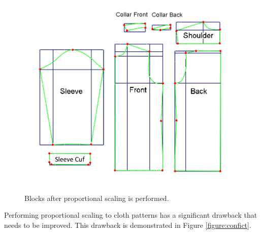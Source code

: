 \begin{figure}[H]
	\centering
	\includegraphics[width=0.9\columnwidth]{../images/all_block_proportional_scaling}\\[0.1cm]
    \caption{Blocks after proportional scaling is performed.}
    \label{figure:all_block_proportional}
\end{figure}


Performing proportional scaling to cloth patterns has a significant drawback that needs to be improved. This drawback is demonstrated in Figure \ref{figure:confict}. 

